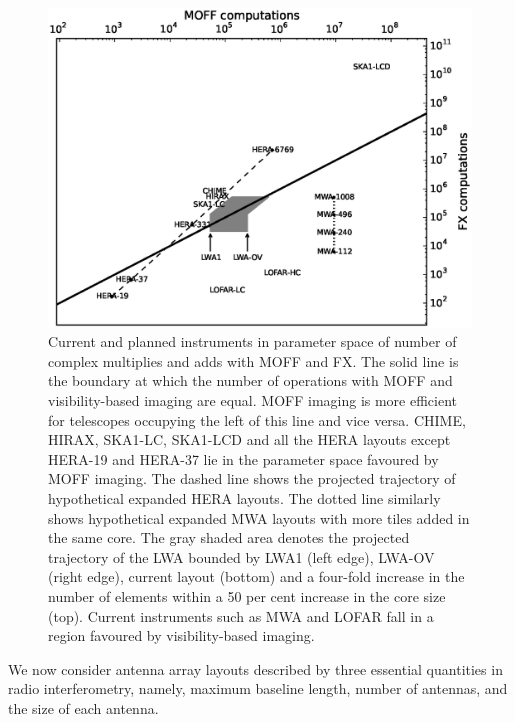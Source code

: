 \documentclass[a4paper,fleqn,usenatbib]{mnras}
\begin{document}
\begin{figure}
  \includegraphics[width=\columnwidth]{figure10}
  \caption{Current and planned instruments in parameter space of
    number of complex multiplies and adds with MOFF and FX. The solid line
    is the boundary at which the number of operations with MOFF and 
    visibility-based imaging are equal. MOFF imaging is more efficient for 
    telescopes occupying the left of this line and vice versa. CHIME, HIRAX, 
    SKA1-LC, SKA1-LCD and all the HERA layouts except HERA-19 and HERA-37 lie 
    in the parameter space favoured by MOFF imaging. The dashed line shows the 
    projected trajectory of hypothetical expanded HERA layouts. The dotted line 
    similarly shows hypothetical expanded MWA layouts with more tiles added in 
    the same core. The gray shaded area denotes the projected trajectory of the 
    LWA bounded by LWA1 (left edge), LWA-OV (right edge), current layout 
    (bottom) and a four-fold increase in the number of elements within a 50 per 
    cent increase in the core size (top). Current instruments such as MWA and 
    LOFAR fall in a region favoured by visibility-based imaging.}
  \label{fig:parameter-space-computations-instruments}
\end{figure}

We now consider antenna array layouts described by three essential quantities 
in radio interferometry, namely, maximum baseline length, number of antennas,
and the size of each antenna. 
\end{document}
